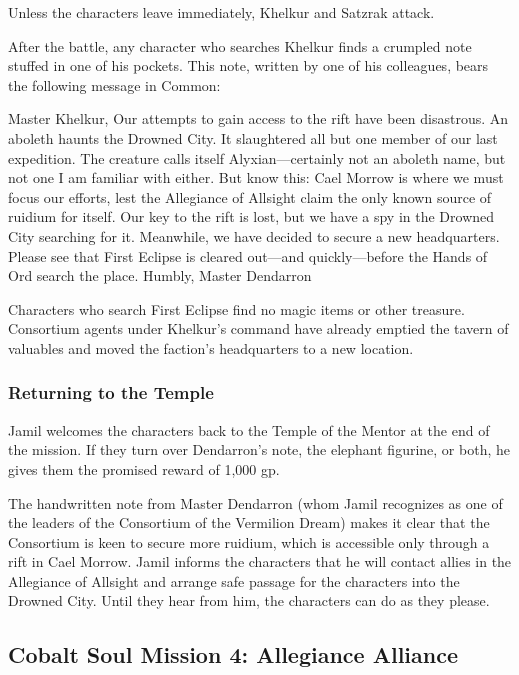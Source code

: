 \documentclass[a4paper, 11pt, bg=full, twocolumn, nooutline]{dndbook}
\begin{document}
Unless the characters leave immediately, Khelkur and Satzrak attack.

After the battle, any character who searches Khelkur finds a crumpled note stuffed in one of his pockets. This note, written by one of his colleagues, bears the following message in Common:

\begin{DndReadAloud}
Master Khelkur,
Our attempts to gain access to the rift have been disastrous. An aboleth haunts the Drowned City. It slaughtered all but one member of our last expedition. The creature calls itself Alyxian---certainly not an aboleth name, but not one I am familiar with either. But know this: Cael Morrow is where we must focus our efforts, lest the Allegiance of Allsight claim the only known source of ruidium for itself.
Our key to the rift is lost, but we have a spy in the Drowned City searching for it. Meanwhile, we have decided to secure a new headquarters. Please see that First Eclipse is cleared out---and quickly---before the Hands of Ord search the place.
Humbly, Master Dendarron
\end{DndReadAloud}

Characters who search First Eclipse find no magic items or other treasure. Consortium agents under Khelkur's command have already emptied the tavern of valuables and moved the faction's headquarters to a new location.

\subsubsection{Returning to the Temple}

Jamil welcomes the characters back to the Temple of the Mentor at the end of the mission. If they turn over Dendarron's note, the elephant figurine, or both, he gives them the promised reward of 1,000 gp.

The handwritten note from Master Dendarron (whom Jamil recognizes as one of the leaders of the Consortium of the Vermilion Dream) makes it clear that the Consortium is keen to secure more ruidium, which is accessible only through a rift in Cael Morrow. Jamil informs the characters that he will contact allies in the Allegiance of Allsight and arrange safe passage for the characters into the Drowned City. Until they hear from him, the characters can do as they please.

\subsection{Cobalt Soul Mission 4: Allegiance Alliance}
\end{document}
